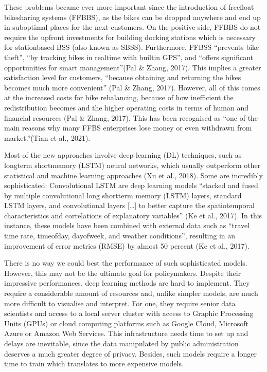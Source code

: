 \documentclass[letterpaper,10pt,english]{jupyterBook}
\begin{document}
\sphinxAtStartPar
These problems became ever more important since the introduction of free\sphinxhyphen{}float bike\sphinxhyphen{}sharing systems (FFBBS), as the bikes can be dropped anywhere and end up in sub\sphinxhyphen{}optimal places for the next customers. On the positive side, FFBBS do not require the upfront investments for building docking stations \sphinxhyphen{} which is necessary for station\sphinxhyphen{}based BSS (also known as SBSS). Furthermore, FFBSS “prevents bike theft”, “by tracking bikes in real\sphinxhyphen{}time with built\sphinxhyphen{}in GPS”, and “offers significant opportunities for smart management”(Pal \& Zhang, 2017). This implies a greater satisfaction level for customers, “because obtaining and returning the bikes becomes much more convenient” (Pal \& Zhang, 2017). However, all of this comes at the increased costs for bike rebalancing, because of how inefficient the redistribution becomes and the higher operating costs in terms of human and financial resources (Pal \& Zhang, 2017). This has been recognised as “one of the main reasons why many FFBS enterprises lose money or even withdrawn from market.”(Tian et al., 2021).

\sphinxAtStartPar
Most of the new approaches involve deep learning (DL) techniques, such as long\sphinxhyphen{}term short\sphinxhyphen{}memory (LSTM) neural networks, which usually outperform other statistical and machine learning approaches (Xu et al., 2018). Some are incredibly sophisticated: Convolutional LSTM are deep learning models “stacked and fused by multiple convolutional long short\sphinxhyphen{}term memory (LSTM) layers, standard LSTM layers, and convolutional layers {[}…{]} to better capture the spatio\sphinxhyphen{}temporal characteristics and correlations of explanatory variables” (Ke et al., 2017). In this instance, these models have been combined with external data such as “travel time rate, time\sphinxhyphen{}of\sphinxhyphen{}day, day\sphinxhyphen{}of\sphinxhyphen{}week, and weather conditions”, resulting in an improvement of error metrics (RMSE) by almost 50 percent (Ke et al., 2017).

\sphinxAtStartPar
There is no way we could best the performance of such sophisticated models. However, this may not be the ultimate goal for policymakers. Despite their impressive performances, deep learning methods are hard to implement. They require a considerable amount of resources and, unlike simpler models, are much more difficult to visualise and interpret. For one, they require senior data scientists and access to a local server cluster with access to Graphic Processing Units (GPUs) or cloud computing platforms such as Google Cloud, Microsoft Azure or Amazon Web Services. This infrastructure needs time to set up and delays are inevitable, since the data manipulated by public administration deserves a much greater degree of privacy. Besides, such models require a longer time to train \sphinxhyphen{} which translates to more expensive models.
\end{document}
